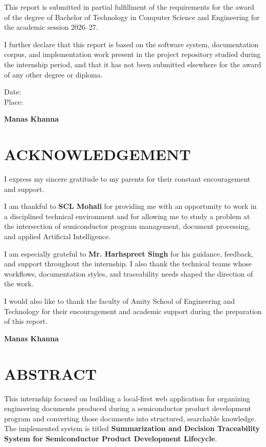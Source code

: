 \documentclass[12pt, a4paper]{article}
\begin{document}
This report is submitted in partial fulfillment of the requirements for the award of the degree of Bachelor of Technology in Computer Science and Engineering for the academic session 2026--27.

I further declare that this report is based on the software system, documentation corpus, and implementation work present in the project repository studied during the internship period, and that it has not been submitted elsewhere for the award of any other degree or diploma.

\vspace{2cm}
\noindent Date: \\
\vspace{1cm}
\noindent Place: \\
\vspace{2cm}

\hfill \textbf{Manas Khanna}
\newpage

\section*{ACKNOWLEDGEMENT}
I express my sincere gratitude to my parents for their constant encouragement and support.

I am thankful to \textbf{SCL Mohali} for providing me with an opportunity to work in a disciplined technical environment and for allowing me to study a problem at the intersection of semiconductor program management, document processing, and applied Artificial Intelligence.

I am especially grateful to \textbf{Mr. Harhspreet Singh} for his guidance, feedback, and support throughout the internship. I also thank the technical teams whose workflows, documentation styles, and traceability needs shaped the direction of the work.

I would also like to thank the faculty of Amity School of Engineering and Technology for their encouragement and academic support during the preparation of this report.

\vspace{1cm}
\hfill \textbf{Manas Khanna}
\newpage

\section*{ABSTRACT}
This internship focused on building a local-first web application for organizing engineering documents produced during a semiconductor product development program and converting those documents into structured, searchable knowledge. The implemented system is titled \textbf{Summarization and Decision Traceability System for Semiconductor Product Development Lifecycle}.
\end{document}
